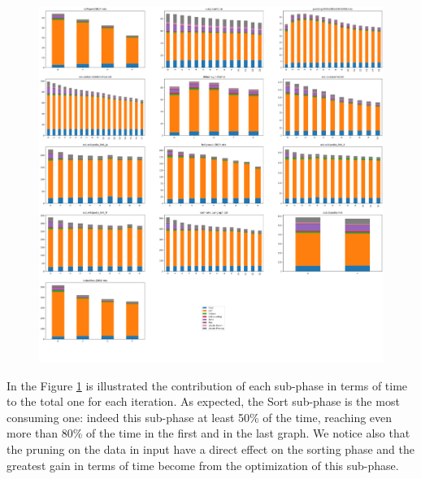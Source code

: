 \begin{figure}[h]
	\centering
	\includegraphics[width=1\linewidth]{0-resources/suphases-sort.png}
	\caption{}
	\label{fig:suphases-sort}
\end{figure}
In the Figure \ref{fig:suphases-sort} is illustrated the contribution of each sub-phase in terms of time to the total one for each iteration.
As expected, the Sort sub-phase is the most consuming one: indeed this sub-phase at least 50\% of the time, reaching even more than 80\% of the time in the first and in the last graph. We notice also that the pruning on the data in input have a direct effect on the sorting phase and the greatest gain in terms of time become from the optimization of this sub-phase. 


